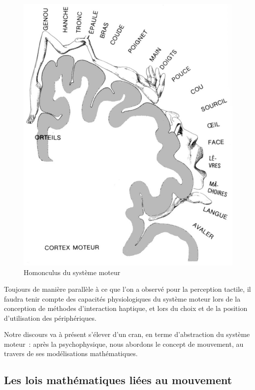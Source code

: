 \documentclass[
]{book}
\begin{document}
\begin{figure}
\centering
\includegraphics{img/homonculus_moteur.png}
\caption{\label{fig:hom2}Homonculus du système moteur}
\end{figure}

Toujours de manière parallèle à ce que l'on a observé pour la perception
tactile, il faudra tenir compte des capacités physiologiques du système
moteur lors de la conception de méthodes d'interaction haptique, et lors du
choix et de la position d'utilisation des périphériques.

Notre discours va à présent s'élever d'un cran, en terme d'abstraction du
système moteur~: après la psychophysique, nous abordons le concept de
mouvement, au travers de ses modélisations mathématiques.

\hypertarget{les-lois-mathuxe9matiques-liuxe9es-au-mouvement}{%
\subsection{Les lois mathématiques liées au mouvement}\label{les-lois-mathuxe9matiques-liuxe9es-au-mouvement}}
\end{document}

